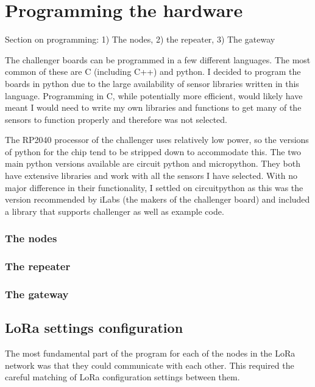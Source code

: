 \section{Programming the hardware}

Section on programming: 1) The nodes, 2) the repeater, 3) The gateway

The challenger boards can be programmed in a few different languages. The most
common of these are C (including C++) and python. I decided to program the
boards in python due to the large availability of sensor libraries written in
this language. Programming in C, while potentially more efficient, would likely
have meant I would need to write my own libraries and functions to get many of
the sensors to function properly and therefore was not selected.

The RP2040 processor of the challenger uses relatively low power, so the
versions of python for the chip tend to be stripped down to accommodate this.
The two main python versions available are circuit python and micropython. They
both have extensive libraries and work with all the sensors I have selected.
With no major difference in their functionality, I settled on circuitpython as
this was the version recommended by iLabs (the makers of the challenger board)
and included a library that supports challenger as well as example code.

\subsubsection{The nodes}

\subsubsection{The repeater}

\subsubsection{The gateway}

\subsection{LoRa settings configuration}

The most fundamental part of the program for each of the nodes in the LoRa
network was that they could communicate with each other. This required the
careful matching of LoRa configuration settings between them.

